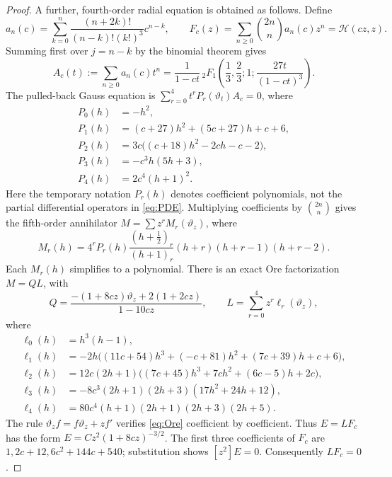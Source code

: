 \documentclass[11pt,a4paper]{article}
\theoremstyle{remark}
\newcommand{\tht}{\vartheta}
\newcommand{\HH}{\mathcal H}
\begin{document}
\begin{proof}
A further, fourth-order radial equation is obtained as follows. Define
\[
 a_n(c)=\sum_{k=0}^n\frac{(n+2k)!}{(n-k)!(k!)^3}c^{n-k},\qquad
 F_c(z)=\sum_{n\geq0}\binom{2n}{n}a_n(c)z^n=\HH(cz,z).
\]
Summing first over $j=n-k$ by the binomial theorem gives
\begin{equation}\label{eq:Gauss}
 A_c(t):=\sum_{n\geq0}a_n(c)t^n
 =\frac1{1-ct}\,{}_2F_1\left(\frac13,\frac23;1;
                              \frac{27t}{(1-ct)^3}\right).
\end{equation}
The pulled-back Gauss equation is
$\sum_{r=0}^4t^rP_r(\tht_t)A_c=0$, where
\begin{align*}
P_0(h)&=-h^2,\\
P_1(h)&=(c+27)h^2+(5c+27)h+c+6,\\
P_2(h)&=3c\bigl((c+18)h^2-2ch-c-2\bigr),\\
P_3(h)&=-c^3h(5h+3),\\
P_4(h)&=2c^4(h+1)^2.
\end{align*}
Here the temporary notation $P_r(h)$ denotes coefficient polynomials,
not the partial differential operators in \eqref{eq:PDE}.
Multiplying coefficients by $\binom{2n}{n}$ gives the fifth-order
annihilator $M=\sum z^rM_r(\tht_z)$, where
\[
 M_r(h)=4^rP_r(h)\frac{(h+\tfrac12)_r}{(h+1)_r}
                         (h+r)(h+r-1)(h+r-2).
\]
Each $M_r(h)$ simplifies to a polynomial. There is an exact Ore
factorization $M=QL$, with
\begin{equation}\label{eq:Ore}
 Q=\frac{-(1+8cz)\tht_z+2(1+2cz)}{1-10cz},\qquad
 L=\sum_{r=0}^4z^r\ell_r(\tht_z),
\end{equation}
where
\begin{align*}
\ell_0(h)&=h^3(h-1),\\
\ell_1(h)&=-2h\bigl((11c+54)h^3+(-c+81)h^2+(7c+39)h+c+6\bigr),\\
\ell_2(h)&=12c(2h+1)\bigl((7c+45)h^3+7ch^2+(6c-5)h+2c\bigr),\\
\ell_3(h)&=-8c^3(2h+1)(2h+3)(17h^2+24h+12),\\
\ell_4(h)&=80c^4(h+1)(2h+1)(2h+3)(2h+5).
\end{align*}
The rule $\tht_z f=f\tht_z+zf'$ verifies \eqref{eq:Ore} coefficient by
coefficient. Thus $E=LF_c$ has the form
$E=Cz^2(1+8cz)^{-3/2}$. The first three coefficients of $F_c$ are
$1,2c+12,6c^2+144c+540$; substitution shows $[z^2]E=0$.
Consequently $LF_c=0$.


\end{proof}
\end{document}
